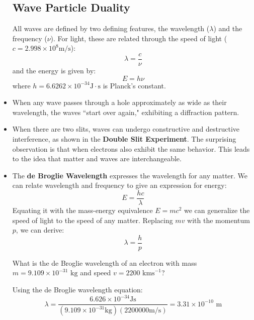 \documentclass{article}
\numberwithin{equation}{section}
\theoremstyle{classic}
\begin{document}
\begin{itemize}
    \subsection{Wave Particle Duality}
    \begin{review}
        All waves are defined by two defining features, the wavelength ($\lambda$) and the frequency ($\nu$). For light, these are related through the speed of light ($c=2.998 \times 10^8 \text{m/s}$):
        \begin{equation}
            \lambda = \frac{c}{\nu}
        \end{equation}
        and the energy is given by:
        \begin{equation}
            E = h\nu
        \end{equation}
        where $h = 6.6262 \times 10^{-34} \text{J}\cdot\text{s}$ is Planck's constant.
    \end{review}
    \item When any wave passes through a hole approximately as wide as their wavelength, the waves ``start over again," exhibiting a diffraction pattern.
    \item When there are two slits, waves can undergo constructive and destructive interference, as shown in the \textbf{Double Slit Experiment}. The surprising observation is that when electrons also exhibit the same behavior. This leads to the idea that matter and waves are interchangeable.
    \item The \textbf{de Broglie Wavelength} expresses the wavelength for any matter. We can relate wavelength and frequency to give an expression for energy:
    $$E = \frac{hc}{\lambda}$$
    Equating it with the mass-energy equivalence $E=mc^2$ we can generalize the speed of light to the speed of any matter. Replacing $mv$ with the momentum $p$, we can derive:
    \begin{equation}
        \lambda = \frac{h}{p}
    \end{equation}
    \begin{exampleQ}
        What is the de Broglie wavelength of an electron with mass $m=9.109 \times 10^{-31} \text{ kg}$ and speed $v = 2200 \text{ kms}^{-1}$?
    \end{exampleQ}
    \begin{exampleS}
        Using the de Broglie wavelength equation:
        $$\lambda = \frac{6.626 \times 10^{-34} \text{Js}}{(9.109 \times 10^{-31}\text{kg})(2200000 \text{m/s})} =  3.31 \times 10^{-10} \text{ m}$$
    \end{exampleS}

\end{itemize}
\end{document}
